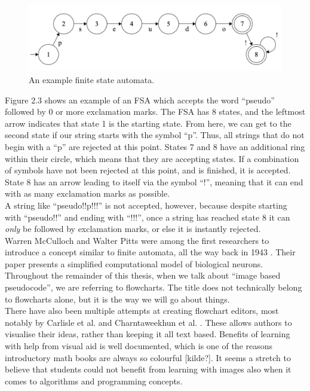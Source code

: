 \begin{figure}[ht]
    \centering
    \includegraphics[scale=0.46]{assets/dfa.png}
    \caption{An example finite state automata.}
    \label{fig:dfa}
\end{figure}

Figure 2.3 shows an example of an FSA which accepts the word ``pseudo'' followed by 0 or more exclamation marks. The FSA has 8 states, and the leftmost arrow indicates that state 1 is the starting state. From here, we can get to the second state if our string starts with the symbol ``p''. Thus, all strings that do not begin with a ``p'' are rejected at this point. States 7 and 8 have an additional ring within their circle, which means that they are accepting states. If a combination of symbols have not been rejected at this point, and is finished, it is accepted. State 8 has an arrow leading to itself via the symbol ``!'', meaning that it can end with as many exclamation marks as possible. \hfill \\

A string like ``pseudo!!p!!!'' is not accepted, however, because despite starting with ``pseudo!!'' and ending with ``!!!'', once a string has reached state 8 it can \textit{only} be followed by exclamation marks, or else it is instantly rejected. \hfill \\

Warren McCulloch and Walter Pitts were among the first researchers to introduce a concept similar to finite automata, all the way back in 1943 \cite{McCulloch43}. Their paper presents a simplified computational model of biological neurons. \hfill \\

Throughout the remainder of this thesis, when we talk about ``image based pseudocode'', we are referring to flowcharts. The title does not technically belong to flowcharts alone, but it is the way we will go about things. \hfill \\

There have also been multiple attempts at creating flowchart editors, most notably by Carlisle et al. and Charntaweekhun et al. \cite{carlisle2004}\cite{charntaweekhun2006}. These allows authors to visualise their ideas, rather than keeping it all text based. Benefits of learning with help from visual aid is well documented, which is one of the reasons introductory math books are always so colourful [kilde?]. It seems a stretch to believe that students could not benefit from learning with images also when it comes to algorithms and programming concepts. \hfill \\

